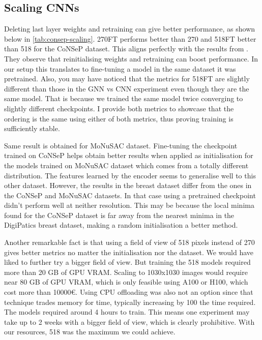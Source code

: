 \newpage
\subsection{Scaling CNNs}

Deleting last layer weights and retraining can give better performance, as shown below in \autoref{tab:consep-scaling}. 270FT performs better than 270 and 518FT better than 518 for the CoNSeP dataset. This aligns perfectly with the results from \cite{zhou2022fortuitous}. They observe that reinitialising weights and retraining can boost performance. In our setup this translates to fine-tuning a model in the same dataset it was pretrained. Also, you may have noticed that the metrics for 518FT are slightly different than those in the GNN vs CNN experiment even though they are the same model. That is because we trained the same model twice converging to slightly different checkpoints. I provide both metrics to showcase that the ordering is the same using either of both metrics, thus proving training is sufficiently stable.

Same result is obtained for MoNuSAC dataset. Fine-tuning the checkpoint trained on CoNSeP helps obtain better results when applied as initialisation for the models trained on MoNuSAC dataset which comes from a totally different distribution. The features learned by the encoder seems to generalise well to this other dataset. However, the results in the breast dataset differ from the ones in the CoNSeP and MoNuSAC datasets. In that case using a pretrained checkpoint didn't perform well at neither resolution. This may be because the local minima found for the CoNSeP dataset is far away from the nearest minima in the DigiPatics breast dataset, making a random initialisation a better method. 

Another remarkable fact is that using a field of view of 518 pixels instead of 270 gives better metrics no matter the initialisation nor the dataset. We would have liked to further try a bigger field of view. But training the 518 models required more than 20 GB of GPU VRAM. Scaling to 1030x1030 images would require near 80 GB of GPU VRAM, which is only feasible using A100 or H100, which cost more than 10000€. Using CPU offloading was also not an option since that technique trades memory for time, typically increasing by 100 the time required. The models required around 4 hours to train. This means one experiment may take up to 2 weeks with a bigger field of view, which is clearly prohibitive. With our resources, 518 was the maximum we could achieve.

